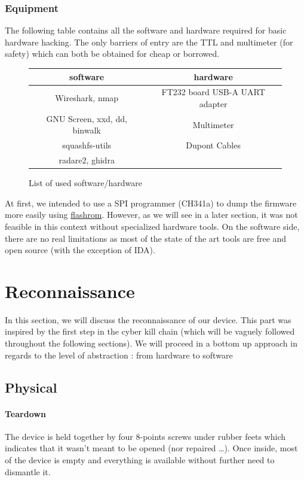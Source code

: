 \documentclass{article}
\begin{document}
\subsubsection{Equipment}
The following table contains all the software and hardware required for basic hardware hacking. The only barriers of entry are the TTL and multimeter (for safety) which can both be obtained for cheap or borrowed.
\begin{figure}[!ht]
\begin{tabular}{|c|c|}
	\hline
	software & hardware \\
	\hline
	Wireshark, nmap & FT232 board USB-A UART adapter \\
	GNU Screen, xxd, dd, binwalk &  Multimeter \\
	squashfs-utils & Dupont Cables \\
	radare2, ghidra & \\
	\hline
\end{tabular}
\caption{List of used software/hardware}
\end{figure}


At first, we intended to use a SPI programmer (CH341a) to dump the firmware more easily using \href{https://github.com/flashrom/flashrom}{flashrom}. However, as we will see in a later section, it was not feasible in this context without specialized hardware tools. On the software side, there are no real limitations as most of the state of the art tools are free and open source (with the exception of IDA).
\section{Reconnaissance}
In this section, we will discuss the reconnaissance of our device. This part was inspired by the first step in the cyber kill chain (which will be vaguely followed throughout the following sections). We will proceed in a bottom up approach in regards to the level of abstraction : from hardware to software
\subsection{Physical}
\paragraph{Teardown} The device is held together by four 8-points screws under rubber feets which indicates that it wasn't meant to be opened (nor repaired \dots). Once inside, most of the device is empty and everything is available without further need to dismantle it. 
\end{document}
